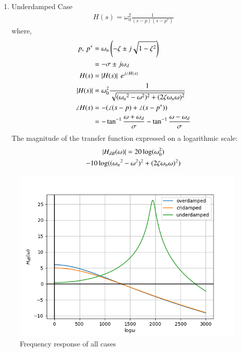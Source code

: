 \documentclass[journal,12pt,twocolumn]{IEEEtran}
\theoremstyle{remark}
\begin{document}
\begin{enumerate}
    \item Underdamped Case
    \begin{align}
        H(s)=\omega_0^2\frac{1}{(s-p)(s-p^\ast)}
    \end{align}
    where,
    \begin{align}
        p,\,p^\ast &=\omega_n\left(-\zeta \pm j\sqrt{1-\zeta^2}\right)\\
        &= -\sigma\pm j\omega_d\\
        H(s) &= \left\vert H(s)\right\vert\ e^{j\angle{H(s)}}\\
        \left\vert H(s)\right\vert &= \omega_0^2\frac{1}{\sqrt{({\omega_n}^2-\omega^2)^2+(2\zeta\omega_n \omega)^2}}\\
        \angle H(s) &= -(\angle(s-p)+\angle(s-p^*))\\
         &= -\tan^{-1}\frac{\omega+\omega_d}{\sigma} - \tan^{-1}\frac{\omega-\omega_d}{\sigma}
    \end{align}
    The magnitude of the transfer function expressed on a logarithmic scale:
    \begin{multline}
        \left\vert H_{dB}(\omega)\right\vert = 20\log(\omega_0^2) \\-10\log(({\omega_n}^2-\omega^2)^2+(2\zeta\omega_n \omega)^2)
    \end{multline}
\end{enumerate}
\begin{figure}[!ht]
    \centering
    \includegraphics[width=\columnwidth]{figs/h_db_plot.png}
    \caption{Frequency response of all cases}
\end{figure}
\end{document}
